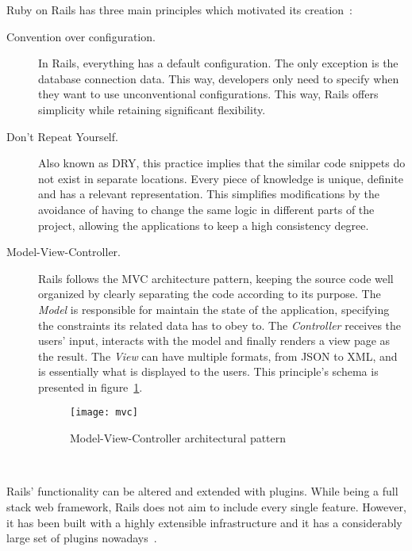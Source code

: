 Ruby on Rails has three main principles which motivated its creation~\cite{agile_webdevelopment_with_rails, ruby_on_rails_principles}:
\begin{description}
\item[Convention over configuration.] In Rails, everything has a default configuration. The only exception is the database connection data. This way, developers only need to specify when they want to use unconventional configurations. This way, Rails offers simplicity while retaining significant flexibility.
\item[Don't Repeat Yourself.] Also known as DRY, this practice implies that the similar code snippets do not exist in separate locations. Every piece of knowledge is unique, definite and has a relevant representation. This simplifies modifications by the avoidance of having to change the same logic in different parts of the project, allowing the applications to keep a high consistency degree.
\item[Model-View-Controller.] Rails follows the MVC architecture pattern, keeping the source code well organized by clearly separating the code according to its purpose. The \textit{Model} is responsible for maintain the state of the application, specifying the constraints its related data has to obey to. The \textit{Controller} receives the users' input, interacts with the model and finally renders a view page as the result. The \textit{View} can have multiple formats, from JSON to XML, and is essentially what is displayed to the users. This principle's schema is presented in figure~\ref{fig:mvc}.
\begin{figure}[h]
  \centering
    \texttt{[image: mvc]}
  \caption{Model-View-Controller architectural pattern}
  \label{fig:mvc}
\end{figure}\\
\end{description}
Rails' functionality can be altered and extended with plugins. While being a full stack web framework, Rails does not aim to include every single feature. However, it has been built with a highly extensible infrastructure and it has a considerably large set of plugins nowadays~\cite{rails_magazine_1}.


